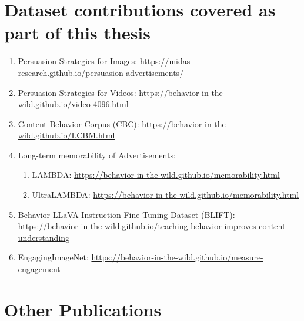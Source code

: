 

\chapter*{Dataset contributions covered as part of this thesis}

\begin{enumerate}
    \item Persuasion Strategies for Images: \url{https://midas-research.github.io/persuasion-advertisements/}
    \item Persuasion Strategies for Videos: \url{https://behavior-in-the-wild.github.io/video-4096.html}
    \item Content Behavior Corpus (CBC): \url{https://behavior-in-the-wild.github.io/LCBM.html}
    \item Long-term memorability of Advertisements:
    \begin{enumerate}
        \item LAMBDA: \url{https://behavior-in-the-wild.github.io/memorability.html}
        \item UltraLAMBDA: \url{https://behavior-in-the-wild.github.io/memorability.html}
    \end{enumerate}
    \item Behavior-LLaVA Instruction Fine-Tuning Dataset (BLIFT): \url{https://behavior-in-the-wild.github.io/teaching-behavior-improves-content-understanding}
    \item EngagingImageNet: \url{https://behavior-in-the-wild.github.io/measure-engagement}
\end{enumerate}




\chapter*{Other Publications}

